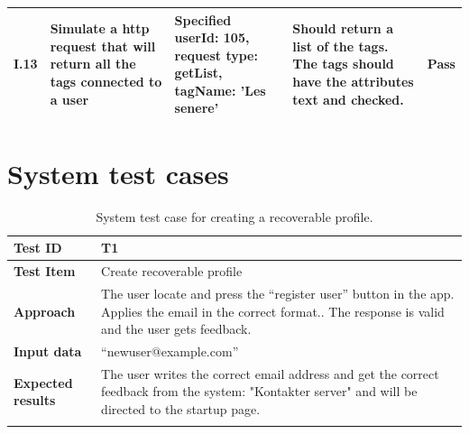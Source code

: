 \begin{appendices}
\begin{center}
\begin{longtable}{ | p{1cm} | p{5.5cm} | p{4cm} | p{4.5cm} | p{2cm}|}
		
		I.13 & Simulate a http request that will return all the tags connected to a user  & Specified userId: 105, \newline request type: getList, \newline tagName: 'Les senere' & Should return a list of the tags. The tags should have the attributes text and checked. & Pass\\ \hline	
		
	\end{longtable}
\end{center}
\raggedbottom
\newpage		

\chapter{System test cases}

\begin{table}[H]
	\centering
	\caption{System test case for creating a recoverable profile.}
	\begin{tabular}[b]{ | l | l  |}
			\hline
			\textbf{Test ID} & T1  \\ \hline
			\textbf{Test Item} & Create recoverable profile \\ \hline
			\textbf{Approach} & \begin{minipage}{5in}The user locate and press the “register user” button in the app. Applies the email in the correct format.. The response is valid and the user gets feedback. \end{minipage}\\ \hline
			\textbf{Input data} &  “newuser@example.com”\\ \hline
			
			\textbf{Expected results} & \begin{minipage}{5in}The user writes the correct email address and get the correct feedback from the system: "Kontakter server" and will be directed to the startup page.\end{minipage}\\ \hline&\\[-3.8ex]
		

\end{tabular}
\end{table}
\end{appendices}
